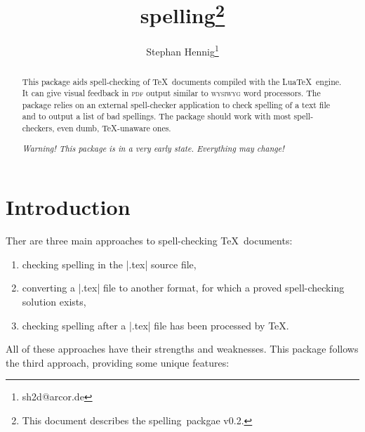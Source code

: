 \documentclass[11pt]{article}
\newcommand*{\pkg}{\textsf{spelling}}
\newcommand*{\acr}[1]{\mbox{\scshape#1}}
\begin{document}
\author{Stephan Hennig\thanks{sh2d@arcor.de}}
\title{\pkg\thanks{This document describes the \pkg\ packgae v0.2.}}
\maketitle


\begin{abstract}
  This package aids spell-checking of \TeX\ documents compiled with the
  Lua\TeX\ engine.  It can give visual feedback in \acr{pdf} output
  similar to \acr{wysiwyg} word processors.  The package relies on an
  external spell-checker application to check spelling of a text file
  and to output a list of bad spellings.  The package should work with
  most spell-checkers, even dumb, \TeX-unaware ones.

  \emph{Warning!  This package is in a very early state.  Everything may
    change!}
\end{abstract}

\begin{multicols}{2}
\small
\makeatletter
\renewcommand{\@tocrmarg}{2.55em plus1fil}
\makeatother
\tableofcontents
\end{multicols}


\section{Introduction}
\label{sec:intro}

Ther are three main approaches to spell-checking \TeX\ documents:

\begin{enumerate}

\item checking spelling in the |.tex| source file,

\item converting a |.tex| file to another format, for which a proved
  spell-checking solution exists,

\item checking spelling after a |.tex| file has been processed by \TeX.

\end{enumerate}

All of these approaches have their strengths and weaknesses.  This
package follows the third approach, providing some unique features:
\end{document}
